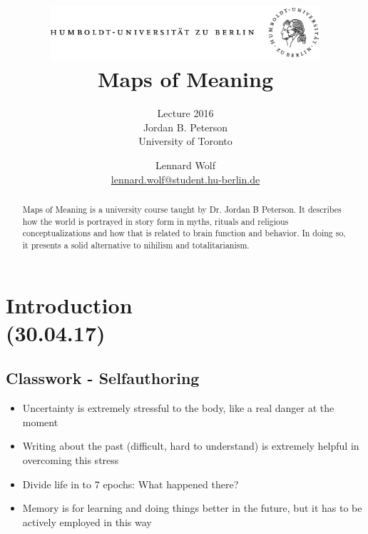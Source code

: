 \documentclass[emulatestandardclasses]{scrartcl}
\date{\vspace{-3ex}}
\begin{document}
\title{
	\includegraphics*[width=0.75\textwidth]{ErstesSem/images/hu_logo.png}\\
	\vspace{24pt}
	Maps of Meaning}
\subtitle{Lecture 2016\\
          Jordan B. Peterson\\
          University of Toronto}
\author{Lennard Wolf\\
        \small{\href{mailto:lennard.wolf@student.hu-berlin.de}{lennard.wolf@student.hu-berlin.de}}}
\maketitle
\begin{abstract}

Maps of Meaning is a university course taught by Dr. Jordan B Peterson. It describes how the world is portrayed in story form in myths, rituals and religious conceptualizations and how that is related to brain function and behavior. In doing so, it presents a solid alternative to nihilism and totalitarianism. 

\end{abstract}
\newpage

\tableofcontents
\listoffigures
\newpage


\section{Introduction\\(30.04.17)}

\subsection{Classwork - Selfauthoring}

\begin{itemize}
  \item Uncertainty is extremely stressful to the body, like a real danger at the moment
  \item Writing about the past (difficult, hard to understand) is extremely helpful in overcoming this stress
  \item Divide life in to 7 epochs: What happened there?
  \item Memory is for learning and doing things better in the future, but it has to be actively employed in this way 
\end{itemize}
\end{document}
